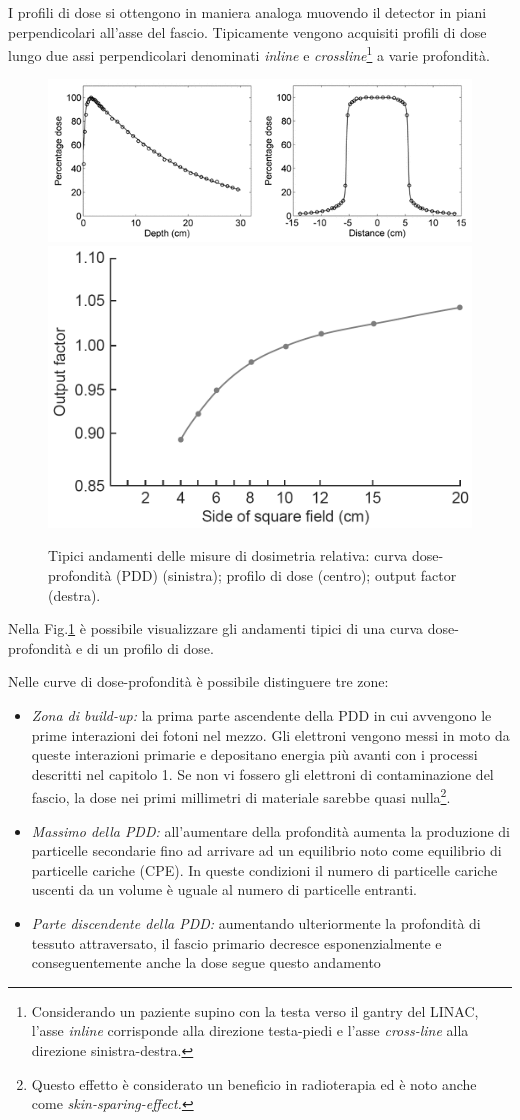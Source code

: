 I profili di dose si ottengono in maniera analoga muovendo il detector in piani perpendicolari all'asse del fascio. Tipicamente vengono acquisiti profili di dose lungo due assi perpendicolari denominati \textit{inline} e \textit{crossline}\footnote{Considerando un paziente supino con la testa verso il gantry del LINAC, l'asse \textit{inline} corrisponde alla direzione testa-piedi e l'asse \textit{cross-line} alla direzione sinistra-destra.} a varie profondità.\\
\begin{figure}[!t]
\centering
\includegraphics[width=.67\textwidth]{./cap2/pdd_prof.png}
\includegraphics[width=.3\textwidth]{./cap2/of.png}
\caption{Tipici andamenti delle misure di dosimetria relativa: curva dose-profondità (PDD) (sinistra); profilo di dose (centro); output factor (destra).}
\label{fig:pdd_prof}
\end{figure}
Nella Fig.\ref{fig:pdd_prof} è possibile visualizzare gli andamenti tipici di una curva dose-profondità e di un profilo di dose.

Nelle curve di dose-profondità è possibile distinguere tre zone:
\begin{itemize}
\item \textit{Zona di build-up:} la prima parte ascendente della PDD in cui avvengono le prime interazioni dei fotoni nel mezzo. Gli elettroni vengono messi in moto da queste interazioni primarie e depositano energia più avanti con i processi descritti nel capitolo 1. Se non vi fossero gli elettroni di contaminazione del fascio, la dose nei primi millimetri di materiale sarebbe quasi nulla\footnote{Questo effetto è considerato un beneficio in radioterapia ed è noto anche come \textit{skin-sparing-effect.}}.
\item \textit{Massimo della PDD:} all'aumentare della profondità aumenta la produzione di particelle secondarie fino ad arrivare ad un equilibrio noto come equilibrio di particelle cariche (CPE). In queste condizioni il numero di particelle cariche uscenti da un volume è uguale al numero di particelle entranti.
\item \textit{Parte discendente della PDD:} aumentando ulteriormente la profondità di tessuto attraversato, il fascio primario decresce esponenzialmente e conseguentemente anche la dose segue questo andamento
\end{itemize}

